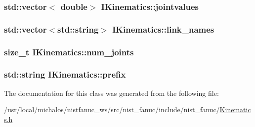 \hypertarget{classIKinematics_a93debe94f7533c89c9c5de92159ac0c7}{
\subsubsection[{jointvalues}]{\setlength{\rightskip}{0pt plus 5cm}std\-::vector$<$ double$>$ I\-Kinematics\-::jointvalues\hspace{0.3cm}{\ttfamily [protected]}}}\label{classIKinematics_a93debe94f7533c89c9c5de92159ac0c7}
\hypertarget{classIKinematics_a08df4ded5de908518e37687ccffe833c}{
\subsubsection[{link\-\_\-names}]{\setlength{\rightskip}{0pt plus 5cm}std\-::vector$<$std\-::string$>$ I\-Kinematics\-::link\-\_\-names\hspace{0.3cm}{\ttfamily [protected]}}}\label{classIKinematics_a08df4ded5de908518e37687ccffe833c}
\hypertarget{classIKinematics_aabe89b2b82b30cdbb97545079d743222}{
\subsubsection[{num\-\_\-joints}]{\setlength{\rightskip}{0pt plus 5cm}size\-\_\-t I\-Kinematics\-::num\-\_\-joints\hspace{0.3cm}{\ttfamily [protected]}}}\label{classIKinematics_aabe89b2b82b30cdbb97545079d743222}
\hypertarget{classIKinematics_a62baaf78436911eca42896cad4b5c911}{
\subsubsection[{prefix}]{\setlength{\rightskip}{0pt plus 5cm}std\-::string I\-Kinematics\-::prefix\hspace{0.3cm}{\ttfamily [protected]}}}\label{classIKinematics_a62baaf78436911eca42896cad4b5c911}


The documentation for this class was generated from the following file\-:\begin{DoxyCompactItemize}
\item 
/usr/local/michalos/nistfanuc\-\_\-ws/src/nist\-\_\-fanuc/include/nist\-\_\-fanuc/\hyperlink{Kinematics_8h}{Kinematics.\-h}\end{DoxyCompactItemize}
